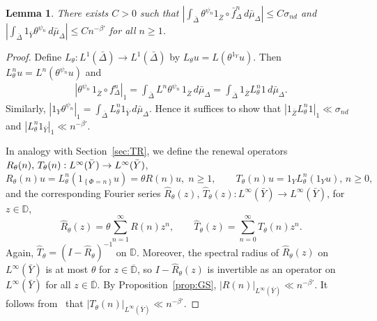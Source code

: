 \documentclass[10pt]{amsart}
\newtheorem{lemm}[theo]{Lemma}\newtheorem{prop}[theo]{Proposition}\newtheorem{coro}[theo]{Corollary}\newtheorem{conj}[theo]{Conjecture}
\theoremstyle{definition}\newtheorem{defi}[theo]{Definition}\newtheorem{rema}[theo]{Remark}\newtheorem{exam}[theo]{Example}\newtheorem{exem}[theo]{Example}\newtheorem{nota}[theo]{Notation}
\newcommand{\D}{\mathbb{D}}
\newcommand{\hR}{\widehat{R}}
\newcommand{\hT}{\widehat{T}}
\newcommand{\barD}{\overline{\D}}
\newcommand{\bY}{\bar{Y}}
\newcommand{\bZ}{\bar{Z}}
\newcommand{\bDelta}{\bar{\Delta}}
\begin{document}
\begin{lemm}\label{lem:Ltheta}
There exists $C>0$ such that $|\int_{\bDelta} \theta^{\psi_n}1_{\bZ}\circ \bar f_\Delta^n\,d\bar\mu_\Delta|\le C \sigma_{nd}$ and $|\int_{\bDelta} 1_{\bY} \theta^{\psi_n}\,d\bar\mu_\Delta|\le C n^{-\beta'}$ for all $n\ge1$.
\end{lemm}


\begin{proof}
Define $L_\theta:L^1(\bDelta)\to L^1(\bDelta)$ by $L_\theta u=L(\theta^{1_Y} u)$. Then $L_\theta^n u=L^n(\theta^{\psi_n} u)$ and
\begin{align*}
\left|\theta^{\psi_n}\,1_{\bZ}\circ f_\Delta^n\right|_1 =\int_{\bDelta} L^n\theta^{\psi_n}\,1_{\bZ}\,d\bar\mu_\Delta =\int_{\bDelta} 1_{\bZ} L_\theta^n1\,d\bar\mu_\Delta.
\end{align*}
Similarly, $|1_Y\theta^{\psi_n}|_1 =\int_{\bDelta} L_\theta^n1_{\bY}\,d\bar\mu_\Delta$. Hence it suffices to show that $|1_{\bZ} L_\theta^n1|_1\ll \sigma_{nd}$ and $|L_\theta^n1_{\bY}|_1\ll n^{-\beta'}$.


In analogy with Section~\ref{sec:TR}, we define the renewal operators $R_\theta(n),\,T_\theta(n):L^\infty(\bY)\linebreak\to L^\infty(\bY)$,
\[
R_\theta(n)u=L_\theta^n\left(1_{\left\{\Phi=n\right\}}u\right)=\theta R(n)u,\;n\ge1,\qquad T_\theta(n)u=1_Y L_\theta^n(1_Y u),\,n\ge0,
\]
and the corresponding Fourier series $\hR_\theta(z),\,\hT_\theta(z):L^\infty(\bY)\to L^\infty(\bY)$, for $z\in\D$,
\[
\hR_\theta(z)=\theta\sum_{n=1}^\infty R(n)z^n,\qquad
\hT_\theta(z)=\sum_{n=0}^\infty T_\theta(n)z^n.
\]
Again, $\hT_\theta=(I-\hR_\theta)^{-1}$ on $\D$. Moreover, the spectral radius of $\hR_\theta(z)$ on $L^\infty(\bY)$ is at most $\theta$ for $z\in\barD$, so $I-\hR_\theta(z)$ is invertible as an operator on $L^\infty(\bY)$ for all $z\in\barD$. By Proposition~\ref{prop:GS}, ${|R(n)|}_{L^\infty(\bY)}\ll n^{-\beta'}$. It follows from~\cite[Theorem~A.3]{Gouezel05} that ${|T_\theta(n)|}_{L^\infty(\bY)}\ll n^{-\beta'}$.


\end{proof}
\end{document}
